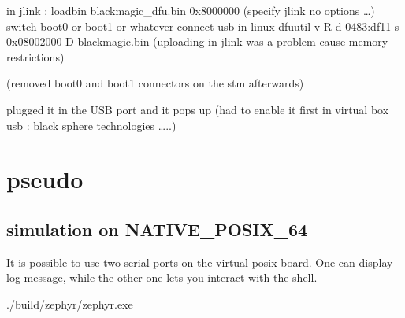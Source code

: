 \documentclass[letterpaper,10pt,english]{sphinxmanual}
\begin{document}
in jlink : loadbin blackmagic\_dfu.bin 0x8000000 (specify jlink no options …)
switch boot0 or boot1 or whatever
connect usb
in linux
dfu\sphinxhyphen{}util \sphinxhyphen{}v \sphinxhyphen{}R \sphinxhyphen{}d 0483:df11 \sphinxhyphen{}s 0x08002000 \sphinxhyphen{}D blackmagic.bin
(uploading in jlink was a problem cause memory restrictions)

\noindent{}

(removed boot0 and boot1 connectors on the stm afterwards)

plugged it in the USB port and it pops up (had to enable it first in virtual box usb : black sphere technologies …..)


\section{pseudo}
\label{\detokenize{debugging/pseudo:pseudo}}\label{\detokenize{debugging/pseudo::doc}}

\subsection{simulation on NATIVE\_POSIX\_64}
\label{\detokenize{debugging/pseudo:simulation-on-native-posix-64}}
It is possible to use two serial ports on the virtual posix board.
One can display log message, while the other one lets you interact with the shell.

\begin{sphinxVerbatim}[commandchars=\\\{\}]
\end{sphinxVerbatim}

\begin{sphinxVerbatim}[commandchars=\\\{\}]
 ./build/zephyr/zephyr.exe


\end{sphinxVerbatim}
\end{document}
